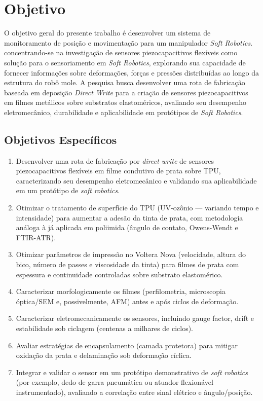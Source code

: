 \section{Objetivo}
\label{section:objetivo}

O objetivo geral do presente trabalho é desenvolver um sistema de monitoramento de posição e movimentação para um manipulador \textit{Soft Robotics}. concentrando-se 
na investigação de sensores piezocapacitivos flexíveis como solução para o sensoriamento em \textit{Soft Robotics}, explorando sua capacidade de fornecer informações 
sobre deformações, forças e pressões distribuídas ao longo da estrutura do robô mole. A pesquisa busca desenvolver uma rota de fabricação baseada em deposição 
\textit{Direct Write} para a criação de sensores piezocapacitivos em filmes metálicos sobre substratos elastoméricos, avaliando seu desempenho eletromecânico, 
durabilidade e aplicabilidade em protótipos de \textit{Soft Robotics}.

\subsection{Objetivos Específicos}

\begin{enumerate}
  \item Desenvolver uma rota de fabricação por \textit{direct write} de sensores piezocapacitivos flexíveis em filme condutivo de prata sobre TPU, caracterizando seu desempenho eletromecânico e validando sua aplicabilidade em um protótipo de \textit{soft robotics}.
  \item Otimizar o tratamento de superfície do TPU (UV-ozônio — variando tempo e intensidade) para aumentar a adesão da tinta de prata, com metodologia análoga à já aplicada em poliimida (ângulo de contato, Owens-Wendt e FTIR-ATR).
  \item Otimizar parâmetros de impressão no Voltera Nova (velocidade, altura do bico, número de passes e viscosidade da tinta) para filmes de prata com espessura e continuidade controladas sobre substrato elastomérico.
  \item Caracterizar morfologicamente os filmes (perfilometria, microscopia óptica/SEM e, possivelmente, AFM) antes e após ciclos de deformação.
  \item Caracterizar eletromecanicamente os sensores, incluindo gauge factor, drift e estabilidade sob ciclagem (centenas a milhares de ciclos).
  \item Avaliar estratégias de encapsulamento (camada protetora) para mitigar oxidação da prata e delaminação sob deformação cíclica.
  \item Integrar e validar o sensor em um protótipo demonstrativo de \textit{soft robotics} (por exemplo, dedo de garra pneumática ou atuador flexionável instrumentado), avaliando a correlação entre sinal elétrico e ângulo/posição.
\end{enumerate}


